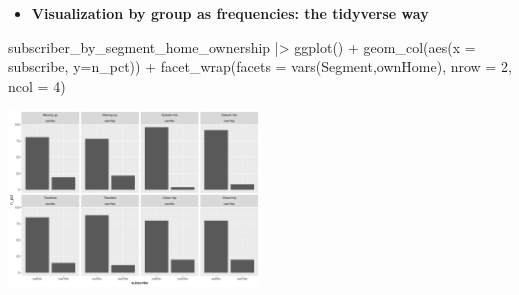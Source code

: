 \documentclass[
  ignorenonframetext,
]{beamer}
\newenvironment{Shaded}{\begin{snugshade}}{\end{snugshade}}
\newcommand{\AttributeTok}[1]{\textcolor[rgb]{0.40,0.45,0.13}{#1}}
\newcommand{\DecValTok}[1]{\textcolor[rgb]{0.68,0.00,0.00}{#1}}
\newcommand{\FunctionTok}[1]{\textcolor[rgb]{0.28,0.35,0.67}{#1}}
\newcommand{\NormalTok}[1]{\textcolor[rgb]{0.00,0.23,0.31}{#1}}
\newcommand{\SpecialCharTok}[1]{\textcolor[rgb]{0.37,0.37,0.37}{#1}}
\providecommand{\tightlist}{%
  \setlength{\itemsep}{0pt}\setlength{\parskip}{0pt}}\usepackage{longtable,booktabs,array}
\begin{document}
\begin{frame}[fragile]{}
\label{section-14}
\begin{itemize}
\tightlist
\item
  \textbf{Visualization by group as frequencies: the tidyverse way}
\end{itemize}

\tiny

\begin{Shaded}
\begin{Highlighting}[]
\NormalTok{subscriber\_by\_segment\_home\_ownership }\SpecialCharTok{|\textgreater{}}
  \FunctionTok{ggplot}\NormalTok{() }\SpecialCharTok{+} 
  \FunctionTok{geom\_col}\NormalTok{(}\FunctionTok{aes}\NormalTok{(}\AttributeTok{x =}\NormalTok{ subscribe, }\AttributeTok{y=}\NormalTok{n\_pct)) }\SpecialCharTok{+} 
  \FunctionTok{facet\_wrap}\NormalTok{(}\AttributeTok{facets =} \FunctionTok{vars}\NormalTok{(Segment,ownHome), }
             \AttributeTok{nrow =} \DecValTok{2}\NormalTok{, }\AttributeTok{ncol =} \DecValTok{4}\NormalTok{)}
\end{Highlighting}
\end{Shaded}

\begin{center}
\includegraphics[width=0.5\textwidth,height=\textheight]{005_comparing_groups_tables_and_visualizations_files/figure-beamer/unnamed-chunk-12-1.pdf}
\end{center}
\end{frame}
\end{document}
